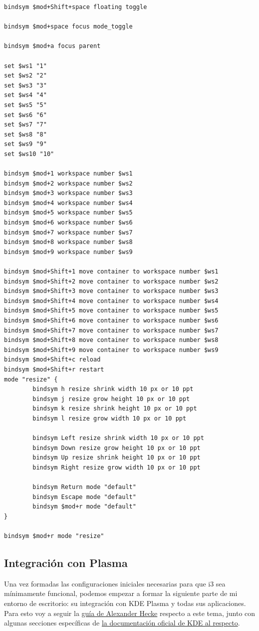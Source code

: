 \documentclass[11pt]{article}
\begin{document}
\begin{verbatim}
bindsym $mod+Shift+space floating toggle

bindsym $mod+space focus mode_toggle

bindsym $mod+a focus parent

set $ws1 "1"
set $ws2 "2"
set $ws3 "3"
set $ws4 "4"
set $ws5 "5"
set $ws6 "6"
set $ws7 "7"
set $ws8 "8"
set $ws9 "9"
set $ws10 "10"

bindsym $mod+1 workspace number $ws1
bindsym $mod+2 workspace number $ws2
bindsym $mod+3 workspace number $ws3
bindsym $mod+4 workspace number $ws4
bindsym $mod+5 workspace number $ws5
bindsym $mod+6 workspace number $ws6
bindsym $mod+7 workspace number $ws7
bindsym $mod+8 workspace number $ws8
bindsym $mod+9 workspace number $ws9

bindsym $mod+Shift+1 move container to workspace number $ws1
bindsym $mod+Shift+2 move container to workspace number $ws2
bindsym $mod+Shift+3 move container to workspace number $ws3
bindsym $mod+Shift+4 move container to workspace number $ws4
bindsym $mod+Shift+5 move container to workspace number $ws5
bindsym $mod+Shift+6 move container to workspace number $ws6
bindsym $mod+Shift+7 move container to workspace number $ws7
bindsym $mod+Shift+8 move container to workspace number $ws8
bindsym $mod+Shift+9 move container to workspace number $ws9
bindsym $mod+Shift+c reload
bindsym $mod+Shift+r restart
mode "resize" {
        bindsym h resize shrink width 10 px or 10 ppt
        bindsym j resize grow height 10 px or 10 ppt
        bindsym k resize shrink height 10 px or 10 ppt
        bindsym l resize grow width 10 px or 10 ppt

        bindsym Left resize shrink width 10 px or 10 ppt
        bindsym Down resize grow height 10 px or 10 ppt
        bindsym Up resize shrink height 10 px or 10 ppt
        bindsym Right resize grow width 10 px or 10 ppt

        bindsym Return mode "default"
        bindsym Escape mode "default"
        bindsym $mod+r mode "default"
}

bindsym $mod+r mode "resize"
\end{verbatim}
\subsection{Integración con Plasma}
\label{sec:orgc0062fa}

Una vez formadas las configuraciones iniciales necesarias para que i3 sea mínimamente funcional, podemos empezar a formar la siguiente parte de mi entorno de escritorio: su integración con KDE Plasma y todas sus aplicaciones. Para esto voy a seguir la \href{https://github.com/heckelson/i3-and-kde-plasma}{guía de Alexander Hecke} respecto a este tema, junto con algunas secciones específicas de \href{https://wikisandbox.kde.org/Tutorials/Using\_Other\_Window\_Managers\_with\_Plasma}{la documentación oficial de KDE al respecto}.
\end{document}
